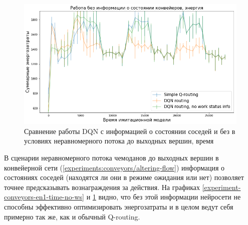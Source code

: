 \documentclass[specification, annotation]{itmo-student-thesis}
\begin{document}
\begin{figure}[!h]
  \caption{Сравнение работы DQN с информацией о состоянии соседей и без в
    условиях неравномерного потока до выходных вершин, время}\label{experiment-conveyors-en1-energy-no-ws}
  \centering
  \includegraphics[scale=0.6]{experiment-conveyors-en1-energy-no-ws}
\end{figure}

В сценарии неравномерного потока чемоданов до выходных вершин в конвейерной сети
(\ref{experiments:conveyors/altering-flow})
информация о состояниях соседей (находятся ли они в режиме ожидания или нет)
позволяет точнее предсказывать вознаграждения за действия. На графиках
\ref{experiment-conveyors-en1-time-no-ws} и
\ref{experiment-conveyors-en1-energy-no-ws} видно, что без этой информации
нейросети не способны эффективно оптимизировать энергозатраты и в целом ведут
себя примерно так же, как и обычный Q-routing.
\end{document}
